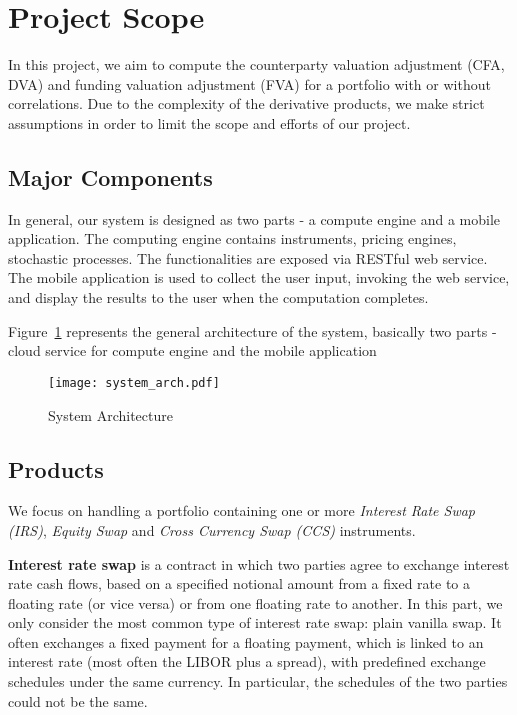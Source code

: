 \section{Project Scope}\label{sec:scope}

In this project, we aim to compute the counterparty valuation adjustment (CFA, DVA) and funding valuation adjustment (FVA) for a portfolio with or without correlations. Due to the complexity of the derivative products, we make strict assumptions in order to limit the scope and efforts of our project.

\subsection{Major Components}

In general, our system is designed as two parts - a compute engine and a mobile application. The computing engine contains instruments, pricing engines, stochastic processes. The functionalities are exposed via RESTful web service. The mobile application is used to collect the user input, invoking the web service, and display the results to the user when the computation completes.

Figure~\ref{fig:arch} represents the general architecture of the system, basically two parts - cloud service for compute engine and the mobile application

\begin{figure}[h]
  \centering
  \texttt{[image: system\_arch.pdf]}
  \caption{System Architecture}\label{fig:arch}
\end{figure}


\subsection{Products}

We focus on handling a portfolio containing one or more \textit{Interest Rate Swap (IRS)}, \textit{Equity Swap} and \textit{Cross Currency Swap (CCS)} instruments.

\textbf{Interest rate swap} is a contract in which two parties agree to exchange interest rate cash flows, based on a specified notional amount from a fixed rate to a floating rate (or vice versa) or from one floating rate to another. In this part, we only consider the most common type of interest rate swap: plain vanilla swap. It often exchanges a fixed payment for a floating payment, which is linked to an interest rate (most often the LIBOR plus a spread), with predefined exchange schedules under the same currency. In particular, the schedules of the two parties could not be the same.

